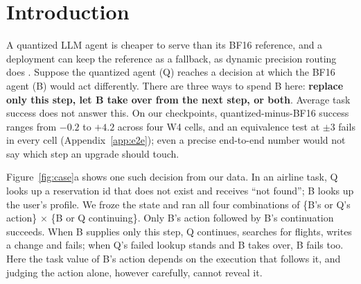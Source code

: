 \section{Introduction}
\label{sec:intro}

A quantized LLM agent is cheaper to serve than its BF16 reference, and a deployment can keep the reference as a fallback, as dynamic precision routing does \citep{li2026dynamicmp}. Suppose the quantized agent (Q) reaches a decision at which the BF16 agent (B) would act differently. There are three ways to spend B here: \textbf{replace only this step, let B take over from the next step, or both}. Average task success does not answer this. On our checkpoints, quantized-minus-BF16 success ranges from $-0.2$ to $+4.2$\pp{} across four W4 cells, and an equivalence test at $\pm$3\pp{} fails in every cell (Appendix~\ref{app:e2e}); even a precise end-to-end number would not say which step an upgrade should touch. %

Figure~\ref{fig:case}a shows one such decision from our data. In an airline task, Q looks up a reservation id that does not exist and receives ``not found''; B looks up the user's profile. We froze the state and ran all four combinations of \{B's or Q's action\} $\times$ \{B or Q continuing\}. Only B's action followed by B's continuation succeeds. When B supplies only this step, Q continues, searches for flights, writes a change and fails; when Q's failed lookup stands and B takes over, B fails too. %
Here the task value of B's action depends on the execution that follows it, and judging the action alone, however carefully, cannot reveal it.

